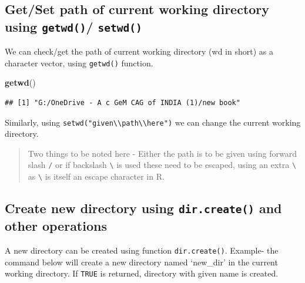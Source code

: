 \documentclass[
]{book}
\newenvironment{Shaded}{\begin{snugshade}}{\end{snugshade}}
\newcommand{\FunctionTok}[1]{\textcolor[rgb]{0.13,0.29,0.53}{\textbf{#1}}}
\newcommand{\NormalTok}[1]{#1}
\begin{document}
\hypertarget{getset-path-of-current-working-directory-using-getwd-setwd}{%
\subsection{\texorpdfstring{Get/Set path of current working directory using \texttt{getwd()}/ \texttt{setwd()}}{Get/Set path of current working directory using getwd()/ setwd()}}\label{getset-path-of-current-working-directory-using-getwd-setwd}}

We can check/get the path of current working directory (wd in short) as a character vector, using \texttt{getwd()}  function.

\begin{Shaded}
\begin{Highlighting}[]
\FunctionTok{getwd}\NormalTok{()}
\end{Highlighting}
\end{Shaded}

\begin{verbatim}
## [1] "G:/OneDrive - A c GeM CAG of INDIA (1)/new book"
\end{verbatim}

Similarly, using \texttt{setwd("given\textbackslash{}\textbackslash{}path\textbackslash{}\textbackslash{}here")} we can change the current working directory.

\begin{quote}
Two things to be noted here - Either the path is to be given using forward slash \texttt{/} or if backslash \texttt{\textbackslash{}} is used these need to be escaped, using an extra \texttt{\textbackslash{}} as \texttt{\textbackslash{}} is itself an escape character in R.
\end{quote}

\hypertarget{create-new-directory-using-dir.create-and-other-operations}{%
\subsection{\texorpdfstring{Create new directory using \texttt{dir.create()} and other operations}{Create new directory using dir.create() and other operations}}\label{create-new-directory-using-dir.create-and-other-operations}}

A new directory can be created using function \texttt{dir.create()}. Example- the command below will create a new directory named `new\_dir' in the current working directory. If \texttt{TRUE} is returned, directory with given name is created.
\end{document}
